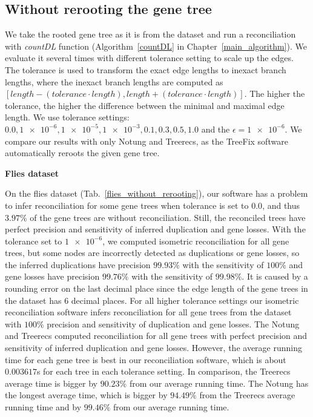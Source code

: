 \subsection{Without rerooting the gene tree} \label{without_rerooting_the_gene_tree}

We take the rooted gene tree as it is from the dataset and run a reconciliation with \emph{countDL} function (Algorithm~\ref{countDL} in Chapter~\ref{main_algorithm}). We evaluate it several times with different tolerance setting to scale up the edges. The tolerance is used to transform the exact edge lengths to inexact branch lengths, where the inexact branch lengths are computed as $[ length - (tolerance \cdot length), length + (tolerance \cdot length)]$. The higher the tolerance, the higher the difference between the minimal and maximal edge length. We use tolerance settings: $0.0, \num{1e-6}, \num{1e-5}, \num{1e-3}, 0.1, 0.3, 0.5, 1.0$ and the $\epsilon = \num{1e-6}$. We compare our results with only Notung and Treerecs, as the TreeFix software automatically reroots the given gene tree.

\noindent\textbf{Flies dataset}

On the flies dataset (Tab.~\ref{flies_without_rerooting}), our software has a problem to infer reconciliation for some gene trees when tolerance is set to $0.0$, and thus $3.97\%$ of the gene trees are without reconciliation. Still, the reconciled trees have perfect precision and sensitivity of inferred duplication and gene losses. With the tolerance set to $\num{1e-6}$, we computed isometric reconciliation for all gene trees, but some nodes are incorrectly detected as duplications or gene losses, so the inferred duplications have precision $99.93\%$ with the sensitivity of $100\%$ and gene losses have precision $99.76\%$ with the sensitivity of $99.98\%$. It is caused by a rounding error on the last decimal place since the edge length of the gene trees in the dataset has 6 decimal places. For all higher tolerance settings our isometric reconciliation software infers reconciliation for all gene trees from the dataset with $100\%$ precision and sensitivity of duplication and gene losses. The Notung and Treerecs computed reconciliation for all gene trees with perfect precision and sensitivity of inferred duplication and gene losses. However, the average running time for each gene tree is best in our reconciliation software, which is about $0.003617$s for each tree in each tolerance setting. In comparison, the Treerecs average time is bigger by $90.23\%$ from our average running time. The Notung has the longest average time, which is bigger by $94.49\%$ from the Treerecs average running time and by $99.46\%$ from our average running time.

